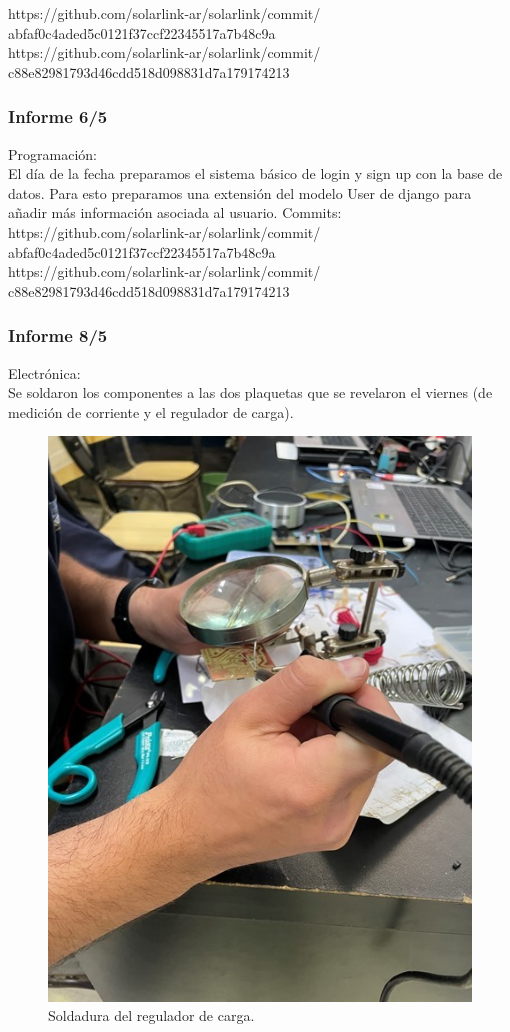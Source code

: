 https://github.com/solarlink-ar/solarlink/commit/\\
abfaf0c4aded5c0121f37ccf22345517a7b48c9a\\

https://github.com/solarlink-ar/solarlink/commit/\\
c88e82981793d46cdd518d098831d7a179174213\\

\subsubsection{Informe 6/5}

Programación:\\

El día de la fecha preparamos el sistema básico de login y sign up con la base de datos. Para esto preparamos una extensión del modelo User de django para añadir más información asociada al usuario.
Commits:\\

https://github.com/solarlink-ar/solarlink/commit/\\abfaf0c4aded5c0121f37ccf22345517a7b48c9a\\

https://github.com/solarlink-ar/solarlink/commit/\\c88e82981793d46cdd518d098831d7a179174213

\subsubsection{Informe 8/5}

Electrónica:\\

Se soldaron los componentes a las dos plaquetas que se revelaron el viernes (de medición de corriente y el regulador de carga).\\

\begin{figure}[H]
    \centering
    \includegraphics[width=0.5\linewidth]{informes/IMG_8068.jpg}
    \caption{Soldadura del regulador de carga.}
\end{figure}


